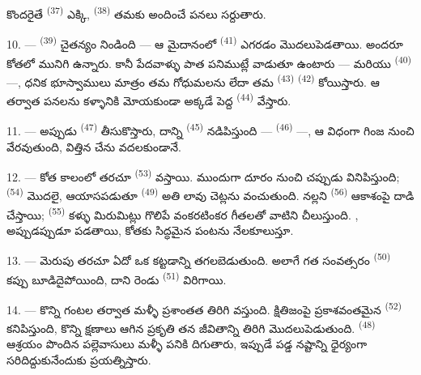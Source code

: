 కొందరైతే  \textsuperscript{(37)} ఎక్కి, 
\textsuperscript{(38)} తమకు అందించే పనలు సర్దుతారు.

10. ---  \textsuperscript{(39)} చైతన్యం నిండింది — ఆ మైదానంలో
 \textsuperscript{(41)} ఎగరడం మొదలుపెడతాయి. అందరూ కోతలో మునిగి ఉన్నారు.
కానీ పేదవాళ్ళు పాత పనిముట్లే వాడుతూ ఉంటారు —  మరియు
 \textsuperscript{(40)} —, ధనిక భూస్వాములు మాత్రం తమ గోధుమలను లేదా తమ
 \textsuperscript{(43)}  \textsuperscript{(42)}
కోయిస్తారు. ఆ తర్వాత పనలను కళ్ళానికి మోయకుండా అక్కడే పెద్ద 
\textsuperscript{(44)} వేస్తారు.

11. --- అప్పుడు  \textsuperscript{(47)} తీసుకొస్తారు, దాన్ని
 \textsuperscript{(45)} నడిపిస్తుంది — 
\textsuperscript{(46)} —, ఆ విధంగా గింజ  నుంచి వేరవుతుంది, విత్తిన చేను
వదలకుండానే.

\VUsaut{5.0mm}
\VUsaut{3.4mm}

12. --- కోత కాలంలో తరచూ  \textsuperscript{(53)} వస్తాయి. ముందుగా దూరం
నుంచి  చప్పుడు వినిపిస్తుంది;  \textsuperscript{(54)}
మొదలై, ఆయాసపడుతూ  \textsuperscript{(49)} అతి లావు చెట్లను వంచుతుంది. నల్లని
 \textsuperscript{(56)} ఆకాశంపై దాడి చేస్తాయి; 
\textsuperscript{(55)} కళ్ళు మిరుమిట్లు గొలిపే వంకరటింకర గీతలతో వాటిని చీలుస్తుంది.
, అప్పుడప్పుడూ  పడతాయి, కోతకు సిద్ధమైన పంటను నేలకూలుస్తూ.

13. --- మెరుపు తరచూ ఏదో ఒక కట్టడాన్ని తగలబెడుతుంది. అలాగే గత సంవత్సరం 
\textsuperscript{(50)} కప్పు బూడిదైపోయింది, దాని రెండు  \textsuperscript{(51)}
విరిగాయి.

14. --- కొన్ని గంటల తర్వాత మళ్ళీ ప్రశాంతత తిరిగి వస్తుంది. క్షితిజంపై ప్రకాశవంతమైన
 \textsuperscript{(52)} కనిపిస్తుంది, కొన్ని క్షణాలు ఆగిన ప్రకృతి తన
జీవితాన్ని తిరిగి మొదలుపెడుతుంది.  \textsuperscript{(48)} ఆశ్రయం పొందిన
పల్లెవాసులు మళ్ళీ పనికి దిగుతారు, ఇప్పుడే పడ్డ నష్టాన్ని ధైర్యంగా సరిదిద్దుకునేందుకు
ప్రయత్నిస్తారు.

\VUsaut{6.0mm}
\VUsaut{3.6mm}

